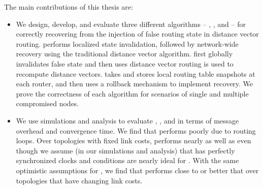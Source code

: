 The main contributions of this thesis are:
\begin{itemize}

	\item  We design, develop, and evaluate three different algorithms -- \seconds, \purges, and \cpr -- for correctly recovering from the injection of false routing state in distance vector routing.
		\second performs localized state invalidation, followed by network-wide recovery using the traditional distance vector algorithm. 
		\purge first globally invalidates false state and then uses distance vector routing is used to recompute distance vectors.  \cpr takes and stores local routing table snapshots at each router, and then uses 
		a rollback mechanism to implement recovery. We prove the correctness of each algorithm for scenarios of single and multiple compromised nodes.

	



	\item We use simulations and analysis to evaluate \seconds, \purges, and \cpr in terms of message overhead and convergence time. We find that \second performs poorly due to routing loops.  
	Over topologies with fixed link costs, \purge performs nearly as well as \cprs even though we assume (in our simulations and analysis) that \cpr has perfectly synchronized clocks and
	conditions are nearly ideal for \cprs.  With the same optimistic assumptions for \cprs, we find that \purge performs close to or better that \cpr over topologies that have changing link costs.

	

\end{itemize}
